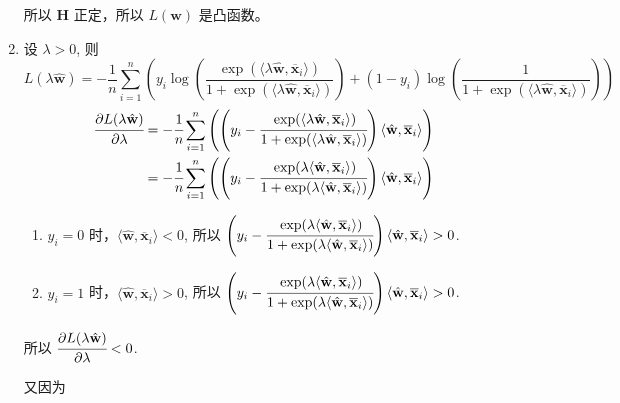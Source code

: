 \documentclass[11pt,letter,notitlepage]{article}
\begin{document}
\begin{solution}
\begin{enumerate}
		      所以 $\mathbf{H}$ 正定，所以 $L(\mathbf{w})$ 是凸函数。
		\item 设 $\lambda>0$, 则
		      $$
			      L(\lambda \hat{\mathbf{w}})
			      =-\frac{1}{n}\sum_{i=1}^n \left( y_i \log \left( \frac{\exp(\langle \lambda \hat{\mathbf{w}},  \overline{\mathbf{x}}_i \rangle)}{1+\exp(\langle \lambda \hat{\mathbf{w}},  \overline{\mathbf{x}}_i \rangle) } \right) + (1-y_i)\log \left( \frac{1}{1+\exp(\langle \lambda \hat{\mathbf{w}},  \overline{\mathbf{x}}_i \rangle)} \right) \right)
		      $$
		      $$\begin{aligned}
				      \cfrac{\partial L(\lambda \hat{\mathbf{w}})}{\partial \lambda}
				       & = -\cfrac{1}{n}\sum_{i=1}^{n}{
				      \left( \left(
					      y_i - \cfrac{\exp(\langle \lambda \hat{\mathbf{w}},\overline{\mathbf{x}}_i \rangle)}{1+\exp(\langle \lambda \hat{\mathbf{w}},\overline{\mathbf{x}}_i \rangle)}
					      \right)
				      \langle \hat{\mathbf{w}},\overline{\mathbf{x}}_i \rangle \right)
				      }                                 \\
				       & =-\cfrac{1}{n}\sum_{i=1}^{n}{
				      \left( \left(
					      y_i - \cfrac{\exp(\lambda\langle \hat{\mathbf{w}},\overline{\mathbf{x}}_i \rangle)}{1+\exp(\lambda\langle \hat{\mathbf{w}},\overline{\mathbf{x}}_i \rangle)}
					      \right)
				      \langle \hat{\mathbf{w}},\overline{\mathbf{x}}_i \rangle \right)
				      }
			      \end{aligned}$$
		      \begin{enumerate}
			      \item $y_i=0$ 时，$\langle \hat{\mathbf{w}},\overline{\mathbf{x}}_i \rangle<0$, 所以 $\left(
				            y_i - \cfrac{\exp(\lambda\langle \hat{\mathbf{w}},\overline{\mathbf{x}}_i \rangle)}{1+\exp(\lambda\langle \hat{\mathbf{w}},\overline{\mathbf{x}}_i \rangle)}
				            \right)
				            \langle \hat{\mathbf{w}},\overline{\mathbf{x}}_i \rangle>0$.
			      \item $y_i=1$ 时，$\langle \hat{\mathbf{w}},\overline{\mathbf{x}}_i \rangle>0$, 所以 $\left(
				            y_i - \cfrac{\exp(\lambda\langle \hat{\mathbf{w}},\overline{\mathbf{x}}_i \rangle)}{1+\exp(\lambda\langle \hat{\mathbf{w}},\overline{\mathbf{x}}_i \rangle)}
				            \right)
				            \langle \hat{\mathbf{w}},\overline{\mathbf{x}}_i \rangle>0$.
		      \end{enumerate}
		      所以 $\cfrac{\partial L(\lambda \hat{\mathbf{w}})}{\partial \lambda}<0$.

		      又因为




\end{enumerate}
\end{solution}
\end{document}
